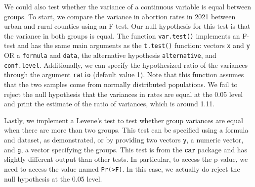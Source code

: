 \documentclass[
  letterpaper,
]{latex/krantz}
\makeatletter
\newenvironment{Shaded}{\begin{snugshade}}{\end{snugshade}}
\newcommand{\CommentTok}[1]{\textcolor[rgb]{0.37,0.37,0.37}{#1}}
\newcommand{\FunctionTok}[1]{\textcolor[rgb]{0.28,0.35,0.67}{#1}}
\newcommand{\NormalTok}[1]{\textcolor[rgb]{0.00,0.23,0.31}{#1}}
\newcommand{\OtherTok}[1]{\textcolor[rgb]{0.00,0.23,0.31}{#1}}
\newcommand{\SpecialCharTok}[1]{\textcolor[rgb]{0.37,0.37,0.37}{#1}}
\newenvironment{kframe}{%
\medskip{}
\setlength{\fboxsep}{.8em}
 \def\at@end@of@kframe{}%
 \ifinner\ifhmode%
  \def\at@end@of@kframe{\end{minipage}}%
  \begin{minipage}{\columnwidth}%
 \fi\fi%
 \def\FrameCommand##1{\hskip\@totalleftmargin \hskip-\fboxsep
 \colorbox{shadecolor}{##1}\hskip-\fboxsep
     \hskip-\linewidth \hskip-\@totalleftmargin \hskip\columnwidth}%
 \MakeFramed {\advance\hsize-\width
   \@totalleftmargin\z@ \linewidth\hsize
   \@setminipage}}%
 {\par\unskip\endMakeFramed%
 \at@end@of@kframe}
\renewenvironment{Shaded}{\begin{kframe}}{\end{kframe}}
\makeatother
\begin{document}
We could also test whether the variance of a continuous variable is
equal between groups. To start, we compare the variance in abortion
rates in 2021 between urban and rural counties using an F-test. Our null
hypothesis for this test is that the variance in both groups is equal.
The function
\texttt{var.test()}
implements an F-test and has the same main arguments as the
\texttt{t.test()} function: vectors \texttt{x} and \texttt{y} OR a
\texttt{formula} and \texttt{data}, the alternative hypothesis
\texttt{alternative}, and \texttt{conf.level}. Additionally, we can
specify the hypothesized ratio of the variances through the argument
\texttt{ratio} (default value 1). Note that this function assumes that
the two samples come from normally distributed populations. We fail to
reject the null hypothesis that the variances in rates are equal at the
0.05 level and print the estimate of the ratio of variances, which is
around 1.11.

\begin{Shaded}
\end{Shaded}

Lastly, we implement a Levene's test
 to test whether
group variances are equal when there are more than two groups. This test
can be specified using a formula and dataset, as demonstrated, or by
providing two vectors \texttt{y}, a numeric vector, and \texttt{g}, a
vector specifying the groups. This test is from the \textbf{car} package
 and has slightly different output than other
tests. In particular, to access the p-value, we need to access the value
named \texttt{\textquotesingle{}Pr(\textgreater{}F)\textquotesingle{}}.
In this case, we actually do reject the null hypothesis at the 0.05
level.
\end{document}
